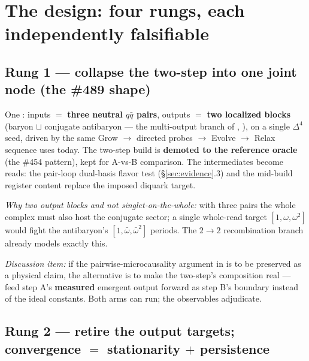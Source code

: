\documentclass[11pt]{article}
\begin{document}
\section{The design: four rungs, each independently falsifiable}
\label{sec:design}

\subsection{Rung 1 --- collapse the two-step into one joint node (the \#489 shape)}
\label{sec:rung1}

One : inputs $=$ \textbf{three neutral $q\bar q$ pairs}, outputs
$=$ \textbf{two localized blocks} (baryon $\sqcup$ conjugate antibaryon --- the
multi-output branch of , ), on a single
$\Delta^4$ seed, driven by the same Grow $\to$ directed probes $\to$ Evolve $\to$ Relax
sequence  uses today. The two-step build is \textbf{demoted to the
reference oracle} (the \#454 pattern), kept for A-vs-B comparison. The intermediates
become reads: the pair-loop dual-basis flavor test (\S\ref{sec:evidence}.3) and the
mid-build register content replace the imposed diquark target.

\emph{Why two output blocks and not singlet-on-the-whole:} with three pairs the whole
complex must also host the conjugate sector; a single whole-read target
$[1,\omega,\omega^2]$ would fight the antibaryon's $[1,\bar\omega,\bar\omega^2]$
periods. The $2\to2$ recombination branch already models exactly this.

\emph{Discussion item:} if the pairwise-microcausality argument in  is to
be preserved as a physical claim, the alternative is to make the two-step's composition
real --- feed step A's \textbf{measured} emergent output forward as step B's boundary
instead of the ideal constants. Both arms can run; the observables adjudicate.

\subsection{Rung 2 --- retire the output targets; convergence $=$ stationarity $+$ persistence}
\label{sec:rung2}
\end{document}
